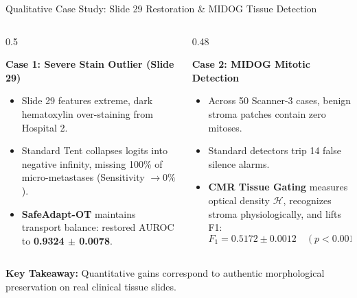 \documentclass[aspectratio=169,10pt]{beamer}
\begin{document}
\begin{frame}{Qualitative Case Study: Slide 29 Restoration & MIDOG Tissue Detection}
    \begin{columns}[T]
        \begin{column}{0.5\textwidth}
            \begin{block}{\textbf{Case 1: Severe Stain Outlier (Slide 29)}}
                \small
                \begin{itemize}
                    \item Slide 29 features extreme, dark hematoxylin over-staining from Hospital 2.
                    \item Standard Tent collapses logits into negative infinity, missing 100\% of micro-metastases (Sensitivity $\to 0\%$).
                    \item \textbf{SafeAdapt-OT} maintains transport balance: restored AUROC to \textbf{\textcolor{MedGreen}{0.9324 $\pm$ 0.0078}}.
                \end{itemize}
            \end{block}
        \end{column}
        \begin{column}{0.48\textwidth}
            \begin{block}{\textbf{Case 2: MIDOG Mitotic Detection}}
                \small
                \begin{itemize}
                    \item Across 50 Scanner-3 cases, benign stroma patches contain zero mitoses.
                    \item Standard detectors trip 14 false silence alarms.
                    \item \textbf{CMR Tissue Gating} measures optical density $\mathcal{H}$, recognizes stroma physiologically, and lifts F1:
                    \begin{equation*}
                        F_1 = \mathbf{0.5172 \pm 0.0012} \quad (p < 0.001)
                    \end{equation*}
                \end{itemize}
            \end{block}
        \end{column}
    \end{columns}
    \vspace{0.3cm}
    \centering
    \scriptsize \textbf{Key Takeaway:} Quantitative gains correspond to authentic morphological preservation on real clinical tissue slides.
\end{frame}
\end{document}

